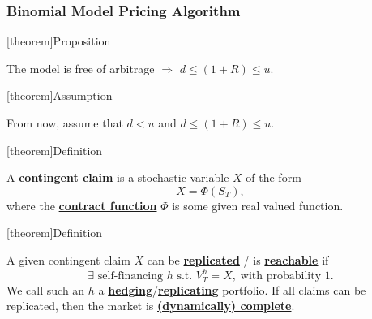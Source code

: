 \documentclass[twocolumn,landscape,10pt]{article}
\theoremstyle{definition}
\begin{document}
\subsubsection{Binomial Model Pricing Algorithm}

[theorem]{Proposition}
\begin{arbitrage cond}
    The model is free of arbitrage $\Rightarrow$ $d\le(1+R)\le u$.
\end{arbitrage cond}

[theorem]{Assumption}
\begin{assumption on u and d}
    From now, assume that $d < u$ and $d\le(1+R)\le u$.
\end{assumption on u and d}

[theorem]{Definition}
\begin{contingent claim in multi-period model}
    A \textbf{\underline{contingent claim}} is a stochastic variable $X$ of the
    form
    \[
        X=\Phi(S_T),
    \]
    where the \textbf{\underline{contract function}} $\Phi$ is some given real
    valued function.
\end{contingent claim in multi-period model}


[theorem]{Definition}
\begin{replicated and reachable in multi-period model}
    A given contingent claim $X$ can be \textbf{\underline{replicated}} / is
    \textbf{\underline{reachable}} if
    \[
        \exists \text{ self-financing } h \text{ s.t. } V_T^h=X,\;\text{with probability 1}.
    \]
    We call such an $h$ a
    \textbf{\underline{hedging}}/\textbf{\underline{replicating}} portfolio.
    If all claims can be replicated, then the market is
    \textbf{\underline{(dynamically) complete}}.
\end{replicated and reachable in multi-period model}
\end{document}

